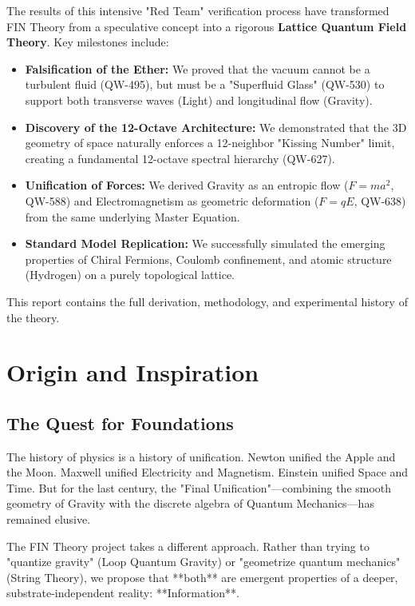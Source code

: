 \documentclass[11pt, a4paper]{report}
\begin{document}
The results of this intensive "Red Team" verification process have transformed FIN Theory from a speculative concept into a rigorous \textbf{Lattice Quantum Field Theory}. Key milestones include:
\begin{itemize}
    \item \textbf{Falsification of the Ether:} We proved that the vacuum cannot be a turbulent fluid (QW-495), but must be a "Superfluid Glass" (QW-530) to support both transverse waves (Light) and longitudinal flow (Gravity).
    \item \textbf{Discovery of the 12-Octave Architecture:} We demonstrated that the 3D geometry of space naturally enforces a 12-neighbor "Kissing Number" limit, creating a fundamental 12-octave spectral hierarchy (QW-627).
    \item \textbf{Unification of Forces:} We derived Gravity as an entropic flow ($F=ma^2$, QW-588) and Electromagnetism as geometric deformation ($F=qE$, QW-638) from the same underlying Master Equation.
    \item \textbf{Standard Model Replication:} We successfully simulated the emerging properties of Chiral Fermions, Coulomb confinement, and atomic structure (Hydrogen) on a purely topological lattice.
\end{itemize}

This report contains the full derivation, methodology, and experimental history of the theory.

\tableofcontents

\chapter{Origin and Inspiration}
\label{chap:origin}

\section{The Quest for Foundations}
The history of physics is a history of unification. Newton unified the Apple and the Moon. Maxwell unified Electricity and Magnetism. Einstein unified Space and Time. But for the last century, the "Final Unification"—combining the smooth geometry of Gravity with the discrete algebra of Quantum Mechanics—has remained elusive.

The FIN Theory project takes a different approach. Rather than trying to "quantize gravity" (Loop Quantum Gravity) or "geometrize quantum mechanics" (String Theory), we propose that **both** are emergent properties of a deeper, substrate-independent reality: **Information**.
\end{document}
